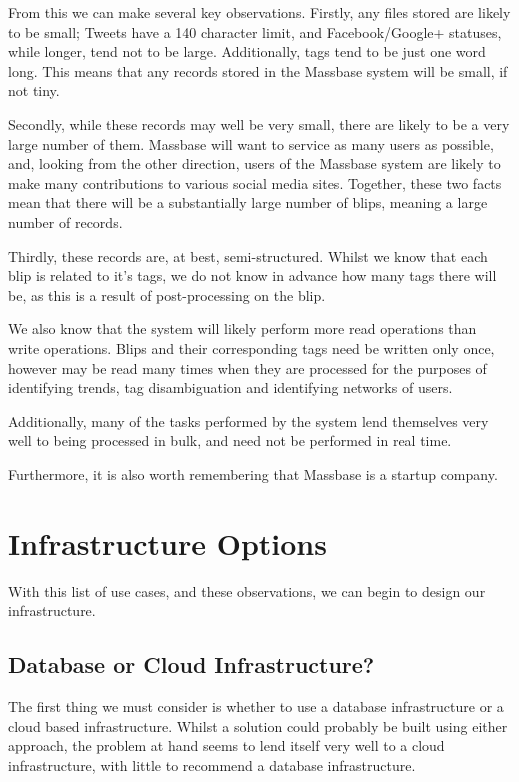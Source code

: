 \documentclass[12pt,a4paper]{article}
\begin{document}
From this we can make several key observations. Firstly, any files stored are likely to be small; Tweets have a 140 character limit, and Facebook/Google+ statuses, while longer, tend not to be large. Additionally, tags tend to be just one word long. This means that any records stored in the Massbase system will be small, if not tiny.

Secondly, while these records may well be very small, there are likely to be a very large number of them. Massbase will want to service as many users as possible, and, looking from the other direction, users of the Massbase system are likely to make many contributions to various social media sites. Together, these two facts mean that there will be a substantially large number of blips, meaning a large number of records.

Thirdly, these records are, at best, semi-structured. Whilst we know that each blip is related to it's tags, we do not know in advance how many tags there will be, as this is a result of post-processing on the blip.

We also know that the system will likely perform more read operations than write operations. Blips and their corresponding tags need be written only once, however may be read many times when they are processed for the purposes of identifying trends, tag disambiguation and identifying networks of users.

Additionally, many of the tasks performed by the system lend themselves very well to being processed in bulk, and need not be performed in real time.

Furthermore, it is also worth remembering that Massbase is a startup company.


\section{Infrastructure Options}
With this list of use cases, and these observations, we can begin to design our infrastructure.

\subsection{Database or Cloud Infrastructure?}
The first thing we must consider is whether to use a database infrastructure or a cloud based infrastructure. Whilst a solution could probably be built using either approach, the problem at hand seems to lend itself very well to a cloud infrastructure, with little to recommend a database infrastructure.
\end{document}
